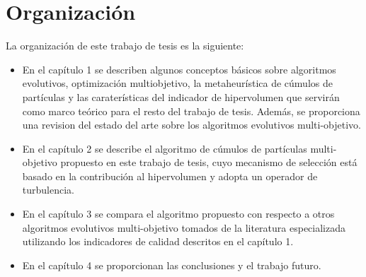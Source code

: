 \section*{Organizaci\'on}

La organizaci\'on de este trabajo de tesis es la siguiente:

\begin{itemize}
 \item  En el cap\'itulo 1 se describen algunos conceptos b\'asicos sobre algoritmos evolutivos, optimizaci\'on multiobjetivo, 
 la metaheur\'istica de c\'umulos de part\'iculas y las carater\'isticas del indicador de hipervolumen que servir\'an como 
 marco te\'orico  para el resto del trabajo de tesis. Adem\'as, se proporciona una revision del estado del arte sobre los 
 algoritmos evolutivos multi-objetivo.
 \item En el cap\'itulo 2 se describe el algoritmo de c\'umulos de part\'iculas multi-objetivo propuesto en este trabajo de 
 tesis, cuyo mecanismo de selecci\'on est\'a basado en la contribuci\'on al hipervolumen y adopta un operador de turbulencia.
 \item En el cap\'itulo 3 se compara el algoritmo propuesto con respecto a otros algoritmos evolutivos multi-objetivo tomados
 de la literatura especializada  utilizando los indicadores de calidad descritos en el cap\'itulo 1.
 \item En el cap\'itulo 4 se proporcionan las conclusiones y el trabajo futuro.
\end{itemize}

